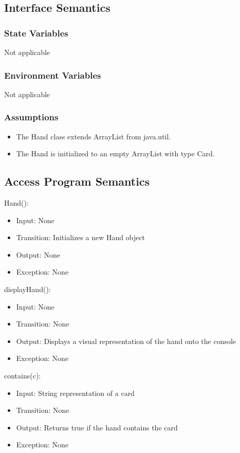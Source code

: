 \documentclass[12pt, titlepage]{article}
\begin{document}
\subsection{Interface Semantics}
\subsubsection{State Variables}
Not applicable

\subsubsection{Environment Variables}
Not applicable

\subsubsection{Assumptions}
\begin{itemize}
    \item The Hand class extends ArrayList from java.util.
    \item The Hand is initialized to an empty ArrayList with type Card.
\end{itemize}

\subsection{Access Program Semantics}
\noindent Hand():
\begin{itemize}
    \item Input: None 
    \item Transition: Initializes a new Hand object 
    \item Output: None 
    \item Exception: None
\end{itemize}

\noindent displayHand():
\begin{itemize}
    \item Input: None 
    \item Transition: None
    \item Output: Displays a visual representation of the hand onto the console
    \item Exception: None
\end{itemize}

\noindent contains(c):
\begin{itemize}
    \item Input: String representation of a card 
    \item Transition: None 
    \item Output: Returns true if the hand contains the card
    \item Exception: None
\end{itemize}
\end{document}
